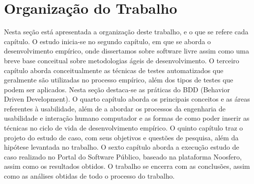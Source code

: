 \section{Organização do Trabalho}


Nesta seção está apresentada a organização deste trabalho, e o que se refere cada capítulo.
%
O estudo inicia-se no segundo capítulo, em que se aborda o desenvolvimento empírico, onde dissertamos sobre software livre assim como uma breve base conceitual sobre metodologias ágeis de desenvolvimento.
%
O terceiro capítulo aborda conceitualmente as técnicas de testes automatizados que geralmente são utilizadas no processo empírico, além dos tipos de testes que podem ser aplicados. Nesta seção destaca-se as práticas do BDD (Behavior Driven Development).
%
O quarto capítulo aborda os principais conceitos e as áreas referentes à usabilidade, além de a abordar os processos da engenharia de usabilidade e interação humano computador e as formas de como poder inserir as técnicas no ciclo de vida de desenvolvimento empírico.
%
O quinto capítulo traz o projeto do estudo de caso, com seus objetivos e questões de pesquisa, além da hipótese levantada no trabalho.
%
O sexto capítulo aborda a execução estudo de caso realizado no Portal do Software Público, baseado na plataforma Noosfero, assim como os resultados obtidos.
%
O trabalho se encerra com as conclusões, assim como as análises obtidas de todo o processo do trabalho.



